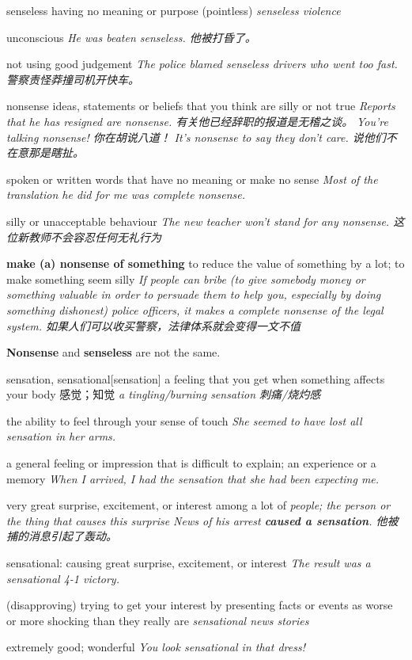 \begin{DefWord}{senseless}
    having no meaning or purpose (pointless)
    \textit{senseless violence}

    unconscious
    \textit{He was beaten senseless. 他被打昏了。}

    not using good judgement
    \textit{The police blamed senseless drivers who went too fast. 警察责怪莽撞司机开快车。}
\end{DefWord}

\begin{DefWord}{nonsense}
    ideas, statements or beliefs that you think are silly or not true
    \textit{Reports that he has resigned are nonsense. 有关他已经辞职的报道是无稽之谈。}
    \textit{You're talking nonsense! 你在胡说八道！}
    \textit{It's nonsense to say they don't care. 说他们不在意那是瞎扯。}

    spoken or written words that have no meaning or make no sense
    \textit{Most of the translation he did for me was complete nonsense.}

    silly or unacceptable behaviour
    \textit{The new teacher won't stand for any nonsense. 这位新教师不会容忍任何无礼行为}

    \textbf{make (a) nonsense of something}
    to reduce the value of something by a lot; to make something seem silly
    \textit{If people can bribe (to give somebody money or something valuable in order to persuade them to help you, especially by doing something dishonest) police officers, it makes a complete nonsense of the legal system. 如果人们可以收买警察，法律体系就会变得一文不值}
\end{DefWord}

\begin{remark}
    \textbf{Nonsense} and \textbf{senseless} are not the same.
\end{remark}

\begin{DefWord}{sensation, sensational}[sensation]
    a feeling that you get when something affects your body 感觉；知觉
    \textit{a tingling/burning sensation 刺痛/烧灼感}

    the ability to feel through your sense of touch
    \textit{She seemed to have lost all sensation in her arms.}

    a general feeling or impression that is difficult to explain; an experience or a memory
    \textit{When I arrived, I had the sensation that she had been expecting me.}

    very great surprise, excitement, or interest among a lot of \textit{people; the person or the thing that causes this surprise
    News of his arrest \textbf{caused a sensation}. 他被捕的消息引起了轰动。}

    sensational: causing great surprise, excitement, or interest
    \textit{The result was a sensational 4-1 victory.}

    (disapproving) trying to get your interest by presenting facts or events as worse or more shocking than they really are
    \textit{sensational news stories}

    extremely good; wonderful
    \textit{You look sensational in that dress!}
\end{DefWord}

